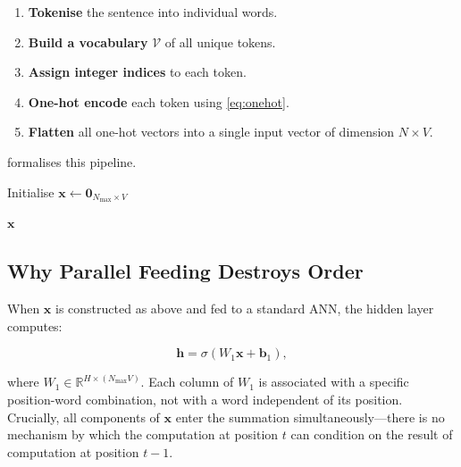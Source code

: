 \documentclass[12pt,a4paper]{article}
\begin{document}
\begin{enumerate}[leftmargin=2em]
  \item \textbf{Tokenise} the sentence into individual words.
  \item \textbf{Build a vocabulary} $\mathcal{V}$ of all unique tokens.
  \item \textbf{Assign integer indices} to each token.
  \item \textbf{One-hot encode} each token using \cref{eq:onehot}.
  \item \textbf{Flatten} all one-hot vectors into a single input vector of
        dimension $N \times V$.
\end{enumerate}

 formalises this pipeline.

\begin{algorithm}[ht]
  \caption{Text-to-Input Vector for an ANN}
  \label{alg:text_to_input}
  \SetAlgoLined

  \BlankLine
  Initialise $\mathbf{x} \leftarrow \mathbf{0}_{N_{\max} \times V}$

  \Return $\mathbf{x}$\;
\end{algorithm}

\subsection{Why Parallel Feeding Destroys Order}
\label{subsec:parallel_destroys_order}

When $\mathbf{x}$ is constructed as above and fed to a standard ANN, the
hidden layer computes:

\begin{equation}
  \label{eq:ann_hidden}
  \mathbf{h} = \sigma(W_1 \mathbf{x} + \mathbf{b}_1),
\end{equation}

where $W_1 \in \mathbb{R}^{H \times (N_{\max} V)}$.  Each column of $W_1$
is associated with a specific position-word combination, not with a word
independent of its position.  Crucially, all components of $\mathbf{x}$
enter the summation simultaneously---there is no mechanism by which the
computation at position $t$ can condition on the result of computation at
position $t-1$.
\end{document}
